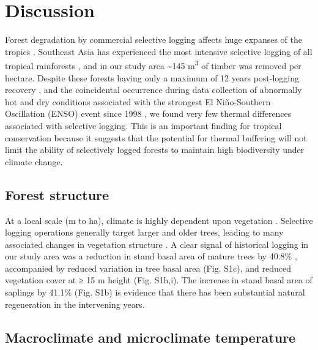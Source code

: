 \documentclass[12pt,a4paper,]{report}
\theoremstyle{definition}
\theoremstyle{definition}
\theoremstyle{definition}
\theoremstyle{remark}
\begin{document}
\section{Discussion}\label{discussion-1}

Forest degradation by commercial selective logging affects huge expanses
of the tropics \citep{asner_contemporary2009, lewis_increasing2015}.
Southeast Asia has experienced the most intensive selective logging of
all tropical rainforests \citep{lewis_increasing2015}, and in our study
area \textasciitilde{}145 m\textsuperscript{3} of timber was removed per
hectare. Despite these forests having only a maximum of 12 years
post-logging recovery \citep{fisher_cost-effective2011}, and the
coincidental occurrence during data collection of abnormally hot and dry
conditions associated with the strongest El Niño-Southern Oscillation
(ENSO) event since 1998 \citep{noaa2015}, we found very few thermal
differences associated with selective logging. This is an important
finding for tropical conservation because it suggests that the potential
for thermal buffering will not limit the ability of selectively logged
forests to maintain high biodiversity under climate change.

\subsection{Forest structure}\label{forest-structure-2}

At a local scale (m to ha), climate is highly dependent upon vegetation
\citep{oke_boundary1987, sears_world2011}. Selective logging operations
generally target larger and older trees, leading to many associated
changes in vegetation structure
\citep{okuda_effect2003, kumar_effects2005, edwards_maintaining2014}. A
clear signal of historical logging in our study area was a reduction in
stand basal area of mature trees by 40.8\% \citep[Fig.
S1a;][]{berry_impacts2008}, accompanied by reduced variation in tree
basal area (Fig. S1c), and reduced vegetation cover at ≥ 15 m height
(Fig. S1h,i). The increase in stand basal area of saplings by 41.1\%
(Fig. S1b) is evidence that there has been substantial natural
regeneration in the intervening years.

\subsection{Macroclimate and microclimate
temperature}\label{macroclimate-and-microclimate-temperature-1}
\end{document}
